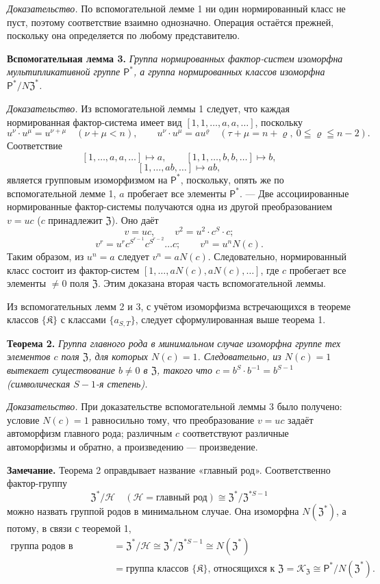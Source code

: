 \documentclass[11pt]{article}
\begin{document}
\noindent\emph{Доказательство.} По вспомогательной лемме 1 ни один нормированный класс не пуст, поэтому соответствие взаимно однозначно. Операция остаётся прежней, поскольку она определяется по любому представителю.

\noindent\textbf{Вспомогательная лемма 3.} \emph{Группа нормированных фактор-систем изоморфна мультипликативной группе \(\mathsf{P}^*\), а группа нормированных классов изоморфна \(\mathsf{P}^*/N\mathfrak Z^*\).}

\noindent\emph{Доказательство.} Из вспомогательной леммы 1 следует, что каждая нормированная фактор-система имеет вид \([1,1,\ldots,a,a,\ldots]\), поскольку
\[
u^\nu\cdot u^\mu=u^{\nu+\mu}\quad(\nu+\mu<n),
\qquad
u^\nu\cdot u^\mu=au^\varrho\quad(\tau+\mu=n+\varrho,\ 0\leqq\varrho\leqq n-2).
\]
Соответствие
\[
[1,\ldots,a,a,\ldots]\mapsto a,
\qquad
[1,1,\ldots,b,b,\ldots]\mapsto b,
\]
\[
[1,\ldots,ab,\ldots]\mapsto ab,
\]
является групповым изоморфизмом на \(\mathsf{P}^*\), поскольку, опять же по вспомогательной лемме 1, \(a\) пробегает все элементы \(\mathsf{P}^*\). --- Две ассоциированные нормированные фактор-системы получаются одна из другой преобразованием \(v=uc\) (\(c\) принадлежит \(\mathfrak Z\)). Оно даёт
\[
v=uc,\qquad v^2=u^2\cdot c^S\cdot c;
\]
\[
v^r=u^r c^{S^{r-1}}c^{S^{r-2}}\ldots c;
\qquad
v^n=u^nN(c).
\]
Таким образом, из \(u^n=a\) следует \(v^n=aN(c)\). Следовательно, нормированный класс состоит из фактор-систем \([1,\ldots,aN(c),aN(c),\ldots]\), где \(c\) пробегает все элементы \(\neq0\) поля \(\mathfrak Z\). Этим доказана вторая часть вспомогательной леммы.

Из вспомогательных лемм 2 и 3, с учётом изоморфизма встречающихся в теореме классов \(\{\mathfrak K\}\) с классами \(\{a_{S,T}\}\), следует сформулированная выше теорема 1.

\noindent\textbf{Теорема 2.} \emph{Группа главного рода в минимальном случае изоморфна группе тех элементов \(c\) поля \(\mathfrak Z\), для которых \(N(c)=1\). Следовательно, из \(N(c)=1\) вытекает существование \(b\neq0\) в \(\mathfrak Z\), такого что \(c=b^S\cdot b^{-1}=b^{S-1}\) (символическая \(S-1\)-я степень).}

\noindent\emph{Доказательство.} При доказательстве вспомогательной леммы 3 было получено: условие \(N(c)=1\) равносильно тому, что преобразование \(v=uc\) задаёт автоморфизм главного рода; различным \(c\) соответствуют различные автоморфизмы и обратно, а произведению --- произведение.

\noindent\textbf{Замечание.} Теорема 2 оправдывает название «главный род». Соответственно фактор-группу
\[
\mathfrak Z^*/\mathscr H
\quad(\mathscr H=\text{главный род})
\cong\mathfrak Z^*/\mathfrak Z^{*S-1}
\]
можно назвать группой родов в минимальном случае. Она изоморфна \(N(\mathfrak Z^*)\), а потому, в связи с теоремой 1,
\[
\begin{aligned}
\text{группа родов в минимальном случае}
&=\mathfrak Z^*/\mathscr H
 \cong\mathfrak Z^*/\mathfrak Z^{*S-1}
 \cong N(\mathfrak Z^*)\\
&=\text{группа классов }\{\mathfrak K\}\text{, относящихся к }\mathfrak Z
 =\mathscr K_{\mathfrak Z}
 \cong \mathsf{P}^*/N(\mathfrak Z^*).
\end{aligned}
\]
\end{document}
